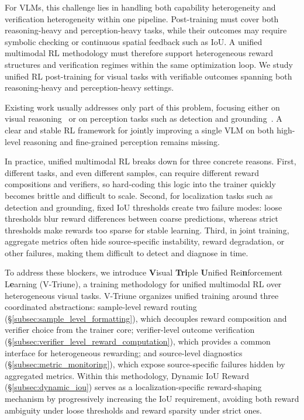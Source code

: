 For VLMs, this challenge lies in handling both capability heterogeneity and verification heterogeneity within one pipeline.
%
Post-training must cover both reasoning-heavy and perception-heavy tasks, while their outcomes may require symbolic checking or continuous spatial feedback such as IoU.
%
A unified multimodal RL methodology must therefore support heterogeneous reward structures and verification regimes within the same optimization loop.
%
We study unified RL post-training for visual tasks with verifiable outcomes spanning both reasoning-heavy and perception-heavy settings.

Existing work usually addresses only part of this problem, focusing either on visual reasoning~\citep{huang2025vision,yang2025r1,meng2025mm,vl_rethinker} or on perception tasks such as detection and grounding~\citep{liu2025visual,ma2025deepperception,tan2025reason,liu2025othink,shen2025vlm,wang2025vl,yu2025perception,liu2025visionreasoner}.
%
A clear and stable RL framework for jointly improving a single VLM on both high-level reasoning and fine-grained perception remains missing.

In practice, unified multimodal RL breaks down for three concrete reasons.
%
First, different tasks, and even different samples, can require different reward compositions and verifiers, so hard-coding this logic into the trainer quickly becomes brittle and difficult to scale.
%
Second, for localization tasks such as detection and grounding, fixed IoU thresholds create two failure modes: loose thresholds blur reward differences between coarse predictions, whereas strict thresholds make rewards too sparse for stable learning.
%
Third, in joint training, aggregate metrics often hide source-specific instability, reward degradation, or other failures, making them difficult to detect and diagnose in time.

To address these blockers, we introduce \textbf{V}isual \textbf{Tri}ple \textbf{U}nified Rei\textbf{n}forcement L\textbf{e}arning (V-Triune), a training methodology for unified multimodal RL over heterogeneous visual tasks.
%
V-Triune organizes unified training around three coordinated abstractions: sample-level reward routing (\S\ref{subsec:sample_level_formatting}), which decouples reward composition and verifier choice from the trainer core; verifier-level outcome verification (\S\ref{subsec:verifier_level_reward_computation}), which provides a common interface for heterogeneous rewarding; and source-level diagnostics (\S\ref{subsec:metric_monitoring}), which expose source-specific failures hidden by aggregated metrics.
%
Within this methodology, Dynamic IoU Reward (\S\ref{subsec:dynamic_iou}) serves as a localization-specific reward-shaping mechanism by progressively increasing the IoU requirement, avoiding both reward ambiguity under loose thresholds and reward sparsity under strict ones.


